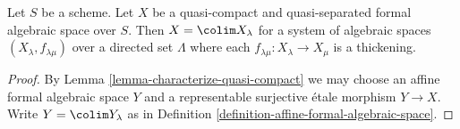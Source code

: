 \begin{lemma}
\label{lemma-structure-quasi-compact-quasi-separated}
\begin{reference}
\cite[Proposition 3.32]{Yasuda}
\end{reference}
Let $S$ be a scheme. Let $X$ be a quasi-compact and quasi-separated
formal algebraic space over $S$. Then $X = \colim X_\lambda$
for a system of algebraic spaces $(X_\lambda, f_{\lambda \mu})$
over a directed set $\Lambda$ where each
$f_{\lambda \mu} : X_\lambda \to X_\mu$ is a thickening.
\end{lemma}

\begin{proof}
By Lemma \ref{lemma-characterize-quasi-compact} we may choose an
affine formal algebraic space $Y$ and a representable surjective
\'etale morphism $Y \to X$. Write $Y = \colim Y_\lambda$ as in
Definition \ref{definition-affine-formal-algebraic-space}.


\end{proof}
